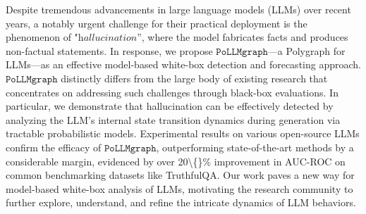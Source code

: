 Despite tremendous advancements in large language models (LLMs) over recent years,  a notably urgent challenge for their practical deployment is the phenomenon of  "$\textit{hallucination}$'', where the model fabricates facts and produces non-factual statements. In response, we propose $\texttt{PoLLMgraph}$—a Polygraph for LLMs—as an effective model-based white-box detection and forecasting approach. $\texttt{PoLLMgraph}$ distinctly differs from the large body of existing research that concentrates on addressing such challenges through black-box evaluations. In particular, we demonstrate that hallucination can be effectively detected by analyzing the LLM's internal state transition dynamics during generation via tractable probabilistic models. Experimental results on various open-source LLMs confirm the efficacy of $\texttt{PoLLMgraph}$, outperforming state-of-the-art methods by a considerable margin, evidenced by over 20\textbackslash\{\}\% improvement in AUC-ROC on common benchmarking datasets like TruthfulQA. Our work paves a new way for model-based white-box analysis of LLMs, motivating the research community to further explore, understand, and refine the intricate dynamics of LLM behaviors.